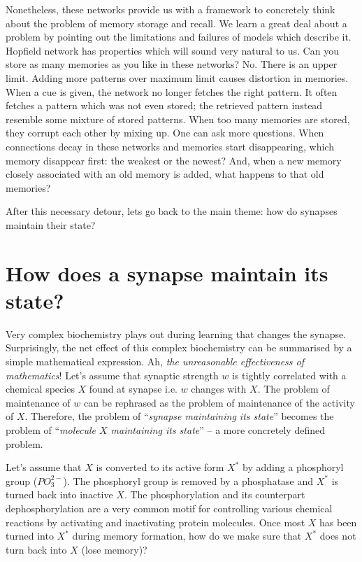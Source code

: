 \documentclass[]{resonance}
\begin{document}

Nonetheless, these networks provide us with a framework to concretely think
about the problem of memory storage and recall. We learn a great deal about a
problem by pointing out the limitations and failures of models which describe
it. Hopfield network has properties which will sound very natural to us. Can you
store as many memories as you like in these networks? No. There is an upper
limit. Adding more patterns over maximum limit causes distortion in memories.
When a cue is given, the network no longer fetches the right pattern. It often
fetches a pattern which was not even stored; the retrieved pattern instead
resemble some mixture of stored patterns. When too many memories are stored,
they corrupt each other by mixing up. One can ask more questions. When
connections decay in these networks and memories start disappearing, which
memory disappear first: the weakest or the newest? And, when a new memory
closely associated with an old memory is added, what happens to that old
memories?

After this necessary detour, lets go back to the main theme: how do synapses
maintain their state?

\section{How does a synapse maintain its state?}

Very complex biochemistry plays out during learning that changes the synapse.
Surprisingly, the net effect of this complex biochemistry can be summarised by a
simple mathematical expression. Ah, \emph{the unreasonable effectiveness of
mathematics}\cite{unreasonable_math}! Let's assume that synaptic strength $w$ is
tightly correlated with a chemical species $X$ found at synapse i.e. $w$ changes
with $X$. The problem of maintenance of $w$ can be rephrased as the problem of
maintenance of the activity of $X$. Therefore, the problem of ``\emph{synapse
maintaining its state}'' becomes the problem of ``\emph{molecule $X$ maintaining
its state}'' -- a more concretely defined problem.

Let's assume that $X$ is converted to its active form $X^*$  by adding a
phosphoryl group ($PO_3^{2-}$). The phosphoryl group is removed by a phosphatase
and $X^*$ is turned back into inactive $X$. The phosphorylation and its
counterpart dephosphorylation are a very common motif for controlling various
chemical reactions by activating and inactivating protein molecules. Once most
$X$ has been turned into $X^*$ during memory formation, how do we make sure that
$X^*$ does not turn back into $X$ (lose memory)?
\end{document}
